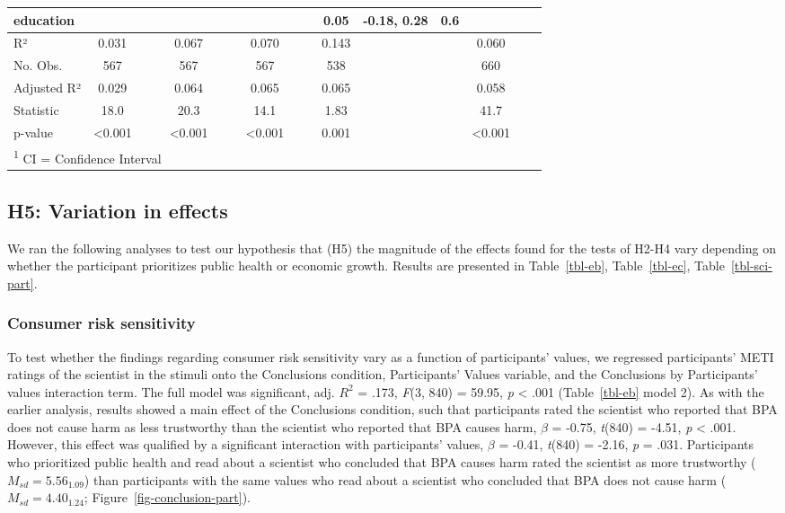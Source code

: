 \documentclass[
  letterpaper,
  DIV=11,
  numbers=noendperiod]{scrartcl}
\begin{document}
\begin{table}
{\begin{tabular}{lccccccccccccccc}
\addlinespace
education &  &  &  &  &  &  &  &  &  & 0.05 & -0.18, 0.28 & 0.6 &  &  & \\
\midrule
R² & 0.031 &  &  & 0.067 &  &  & 0.070 &  &  & 0.143 &  &  & 0.060 &  & \\
No. Obs. & 567 &  &  & 567 &  &  & 567 &  &  & 538 &  &  & 660 &  & \\
Adjusted R² & 0.029 &  &  & 0.064 &  &  & 0.065 &  &  & 0.065 &  &  & 0.058 &  & \\
Statistic & 18.0 &  &  & 20.3 &  &  & 14.1 &  &  & 1.83 &  &  & 41.7 &  & \\
\addlinespace
p-value & <0.001 &  &  & <0.001 &  &  & <0.001 &  &  & 0.001 &  &  & <0.001 &  & \\
\bottomrule
\multicolumn{16}{l}{\rule{0pt}{1em}\textsuperscript{1} CI = Confidence Interval}\\
\end{tabular}}
\end{table}

\hypertarget{h5-variation-in-effects}{%
\subsection{H5: Variation in effects}\label{h5-variation-in-effects}}

We ran the following analyses to test our hypothesis that (H5) the
magnitude of the effects found for the tests of H2-H4 vary depending on
whether the participant prioritizes public health or economic growth.
Results are presented in
Table~\ref{tbl-eb}, Table~\ref{tbl-ec}, Table~\ref{tbl-sci-part}.

\hypertarget{consumer-risk-sensitivity}{%
\subsubsection{Consumer risk
sensitivity}\label{consumer-risk-sensitivity}}

To test whether the findings regarding consumer risk sensitivity vary as
a function of participants' values, we regressed participants' METI
ratings of the scientist in the stimuli onto the Conclusions condition,
Participants' Values variable, and the Conclusions by Participants'
values interaction term. The full model was significant, adj. \(R^2\) =
.173, \emph{F}(3, 840) = 59.95, \emph{p} \textless{} .001
(Table~\ref{tbl-eb} model 2). As with the earlier analysis, results
showed a main effect of the Conclusions condition, such that
participants rated the scientist who reported that BPA does not cause
harm as less trustworthy than the scientist who reported that BPA causes
harm, \(\beta\) = -0.75, \emph{t}(840) = -4.51, \emph{p} \textless{}
.001. However, this effect was qualified by a significant interaction
with participants' values, \(\beta\) = -0.41, \emph{t}(840) = -2.16,
\emph{p} = .031. Participants who prioritized public health and read
about a scientist who concluded that BPA causes harm rated the scientist
as more trustworthy (\(M_{sd} = 5.56_{1.09}\)) than participants with
the same values who read about a scientist who concluded that BPA does
not cause harm (\(M_{sd} = 4.40_{1.24}\);
Figure~\ref{fig-conclusion-part}).
\end{document}
